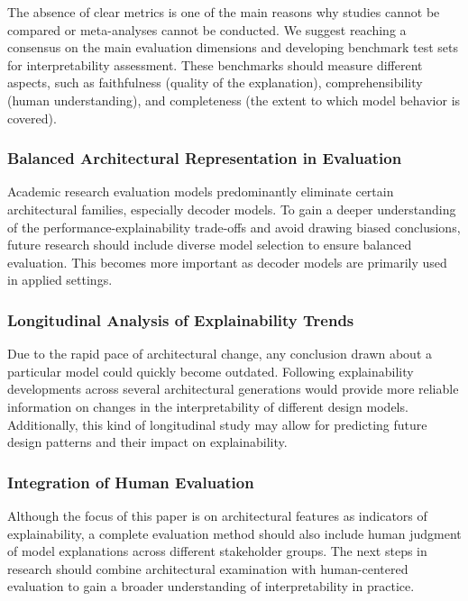 \documentclass[preprint,12pt]{elsarticle}
\begin{document}
The absence of clear metrics is one of the main reasons why studies cannot be compared or meta-analyses cannot be conducted. We suggest reaching a consensus on the main evaluation dimensions and developing benchmark test sets for interpretability assessment. These benchmarks should measure different aspects, such as faithfulness (quality of the explanation), comprehensibility (human understanding), and completeness (the extent to which model behavior is covered).

\subsubsection{Balanced Architectural Representation in Evaluation}

Academic research evaluation models predominantly eliminate certain architectural families, especially decoder models. To gain a deeper understanding of the performance-explainability trade-offs and avoid drawing biased conclusions, future research should include diverse model selection to ensure balanced evaluation. This becomes more important as decoder models are primarily used in applied settings.

\subsubsection{Longitudinal Analysis of Explainability Trends}

Due to the rapid pace of architectural change, any conclusion drawn about a particular model could quickly become outdated. Following explainability developments across several architectural generations would provide more reliable information on changes in the interpretability of different design models. Additionally, this kind of longitudinal study may allow for predicting future design patterns and their impact on explainability.

\subsubsection{Integration of Human Evaluation}

Although the focus of this paper is on architectural features as indicators of explainability, a complete evaluation method should also include human judgment of model explanations across different stakeholder groups. The next steps in research should combine architectural examination with human-centered evaluation to gain a broader understanding of interpretability in practice.
\end{document}
